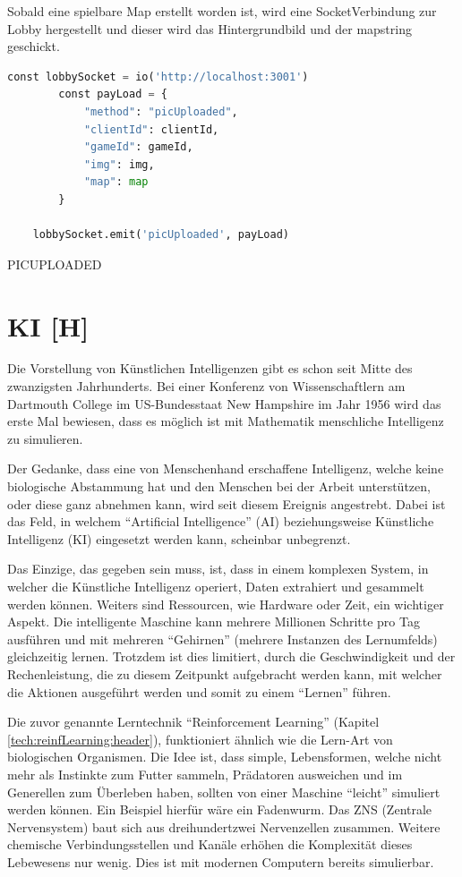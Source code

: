 Sobald eine spielbare Map erstellt worden ist, wird eine SocketVerbindung zur Lobby hergestellt und dieser wird das Hintergrundbild und der mapstring geschickt.

\begin{lstlisting}[language=Python,caption=Map wird an Lobby geschickt]
    const lobbySocket = io('http://localhost:3001')
        const payLoad = {
            "method": "picUploaded",
            "clientId": clientId,
            "gameId": gameId,
            "img": img,
            "map": map
        }

    lobbySocket.emit('picUploaded', payLoad)
\end{lstlisting}

PICUPLOADED

\section{KI [H]}\label{maai:ai:title}
Die Vorstellung von Künstlichen Intelligenzen gibt es schon seit Mitte des zwanzigsten Jahrhunderts. Bei einer Konferenz von Wissenschaftlern am Dartmouth College im US-Bundesstaat New Hampshire im Jahr 1956 wird das erste Mal bewiesen, dass es möglich ist mit Mathematik menschliche Intelligenz zu simulieren. \cite{kigeschichte}

Der Gedanke, dass eine von Menschenhand erschaffene Intelligenz, welche keine biologische Abstammung hat und den Menschen bei der Arbeit unterstützen, oder diese ganz abnehmen kann, wird seit diesem Ereignis angestrebt. Dabei ist das Feld, in welchem ``Artificial Intelligence'' (AI) beziehungsweise Künstliche Intelligenz (KI) eingesetzt werden kann, scheinbar unbegrenzt.

Das Einzige, das gegeben sein muss, ist, dass in einem komplexen System, in welcher die Künstliche Intelligenz operiert, Daten extrahiert und gesammelt werden können. Weiters sind Ressourcen, wie Hardware oder Zeit, ein wichtiger Aspekt. Die intelligente Maschine kann mehrere Millionen Schritte pro Tag ausführen und mit mehreren ``Gehirnen'' (mehrere Instanzen des Lernumfelds) gleichzeitig lernen. Trotzdem ist dies limitiert, durch die Geschwindigkeit und der Rechenleistung, die zu diesem Zeitpunkt aufgebracht werden kann, mit welcher die Aktionen ausgeführt werden und somit zu einem ``Lernen'' führen.

Die zuvor genannte Lerntechnik ``Reinforcement Learning'' (Kapitel \ref{tech:reinfLearning:header}), funktioniert ähnlich wie die Lern-Art von biologischen Organismen. Die Idee ist, dass simple, Lebensformen, welche nicht mehr als Instinkte zum Futter sammeln, Prädatoren ausweichen und im Generellen zum Überleben haben, sollten von einer Maschine ``leicht'' simuliert werden können. Ein Beispiel hierfür wäre ein Fadenwurm. Das ZNS (Zentrale Nervensystem) baut sich aus dreihundertzwei Nervenzellen zusammen. Weitere chemische Verbindungsstellen und Kanäle erhöhen die Komplexität dieses Lebewesens nur wenig. Dies ist mit modernen Computern bereits simulierbar. \cite{worm}


